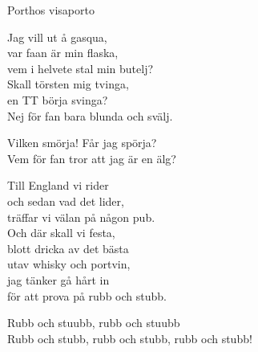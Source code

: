 \begin{song}{Porthos visa}{porto}
\begin{vers}
Jag vill ut å gasqua,\\
var faan är min flaska,\\
vem i helvete stal min butelj?\\
Skall törsten mig tvinga,\\
en TT börja svinga?\\
Nej för fan bara blunda och svälj.\\
\end{vers}
\begin{vers}
Vilken smörja! Får jag spörja?\\
Vem för fan tror att jag är en älg?\\
\end{vers}
\begin{vers}
Till England vi rider\\
och sedan vad det lider,\\
träffar vi välan på någon pub.\\
Och där skall vi festa,\\
blott dricka av det bästa\\
utav whisky och portvin,\\
jag tänker gå hårt in\\
för att prova på rubb och stubb.\\
\end{vers}
\begin{vers}
Rubb och stuubb, rubb och stuubb\\
Rubb och stubb, rubb och stubb, rubb och stubb!\\
\end{vers}
\end{song}

\newpage

